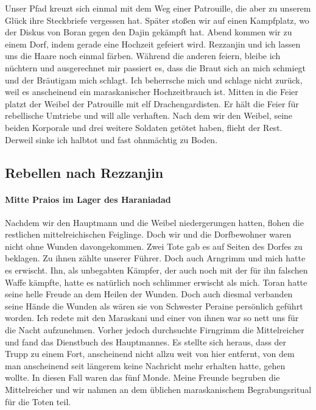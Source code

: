 Unser Pfad kreuzt sich einmal mit dem Weg einer Patrouille, die aber zu unserem Glück ihre Steckbriefe vergessen hat. Später stoßen wir auf einen Kampfplatz, wo der Diskus von Boran gegen den Dajin gekämpft hat. Abend kommen wir zu einem Dorf, indem gerade eine Hochzeit gefeiert wird. Rezzanjin und ich lassen uns die Haare noch einmal färben. Während die anderen feiern, bleibe ich nüchtern und ausgerechnet mir passiert es, dass die Braut sich an mich schmiegt und der Bräutigam mich schlagt. Ich beherrsche mich und schlage nicht zurück, weil es anscheinend ein maraskanischer Hochzeitbrauch ist. Mitten in die Feier platzt der Weibel der Patrouille mit elf Drachengardisten. Er hält die Feier für rebellische Umtriebe und will alle verhaften. Nach dem wir den Weibel, seine beiden Korporale und drei weitere Soldaten getötet haben, flieht der Rest. Derweil sinke ich halbtot und fast ohnmächtig zu Boden.

\subsection{Rebellen nach Rezzanjin}

\paragraph{Mitte Praios im Lager des Haraniadad}
Nachdem wir den Hauptmann und die Weibel niedergerungen hatten, flohen die restlichen mittelreichischen Feiglinge. Doch wir und die Dorfbewohner waren nicht ohne Wunden davongekommen. Zwei Tote gab es auf Seiten des Dorfes zu beklagen. Zu ihnen zählte unserer Führer. Doch auch Arngrimm und mich hatte es erwischt. Ihn, als unbegabten Kämpfer, der auch noch mit der für ihn falschen Waffe kämpfte, hatte es natürlich noch schlimmer erwischt als mich. Toran hatte seine helle Freude an dem Heilen der Wunden. Doch auch diesmal verbanden seine Hände die Wunden als wären sie von Schwester Peraine persönlich geführt worden. Ich redete mit den Maraskani und einer von ihnen war so nett uns für die Nacht aufzunehmen. Vorher jedoch durchsuchte Firngrimm die Mittelreicher und fand das Dienstbuch des Hauptmannes. Es stellte sich heraus, dass der Trupp zu einem Fort, anscheinend nicht allzu weit von hier entfernt, von dem man anscheinend seit längerem keine Nachricht mehr erhalten hatte, gehen wollte. In diesen Fall waren das fünf Monde. Meine Freunde begruben die Mittelreicher und wir nahmen an dem üblichen maraskanischem Begrabungsritual für die Toten teil.

